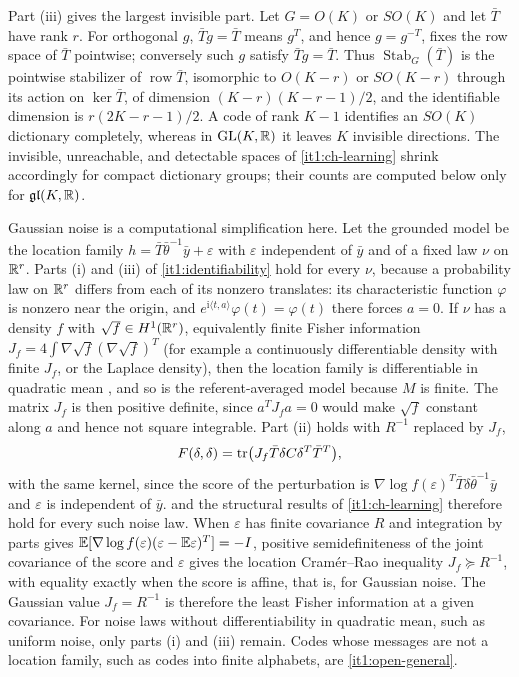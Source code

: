 Part (iii) gives the largest invisible part. Let $G=O(K)$ or $SO(K)$ and let $\bar T$ have rank $r$. For orthogonal $g$, $\bar Tg=\bar T$ means $g^T$, and hence $g=g^{-T}$, fixes the row space of $\bar T$ pointwise; conversely such $g$ satisfy $\bar Tg=\bar T$. Thus $\operatorname{Stab}_G(\bar T)$ is the pointwise stabilizer of $\operatorname{row}\bar T$, isomorphic to $O(K-r)$ or $SO(K-r)$ through its action on $\ker\bar T$, of dimension $(K-r)(K-r-1)/2$, and the identifiable dimension is $r(2K-r-1)/2$. A code of rank $K-1$ identifies an $SO(K)$ dictionary completely, whereas in $\mathrm{GL}(K,\mathbb R)$ it leaves $K$ invisible directions. The invisible, unreachable, and detectable spaces of \cref{it1:ch-learning} shrink accordingly for compact dictionary groups; their counts are computed below only for $\mathfrak{gl}(K,\mathbb R)$.

Gaussian noise is a computational simplification here. Let the grounded model be the location family $h=\bar T\bar\theta^{-1}\bar y+\varepsilon$ with $\varepsilon$ independent of $\bar y$ and of a fixed law $\nu$ on $\mathbb R^r$. Parts (i) and (iii) of \cref{it1:identifiability} hold for every $\nu$, because a probability law on $\mathbb R^r$ differs from each of its nonzero translates: its characteristic function $\varphi$ is nonzero near the origin, and $e^{\mathrm i\langle t,a\rangle}\varphi(t)=\varphi(t)$ there forces $a=0$. If $\nu$ has a density $f$ with $\sqrt f\in H^1(\mathbb R^r)$, equivalently finite Fisher information $J_f=4\int\nabla\sqrt f(\nabla\sqrt f)^T$ (for example a continuously differentiable density with finite $J_f$, or the Laplace density), then the location family is differentiable in quadratic mean \citep[Chapter~7]{vanderVaart1998}, and so is the referent-averaged model because $M$ is finite. The matrix $J_f$ is then positive definite, since $a^TJ_fa=0$ would make $\sqrt f$ constant along $a$ and hence not square integrable. Part (ii) holds with $R^{-1}$ replaced by $J_f$,
\begin{equation}
F(\delta,\delta)=\operatorname{tr}\bigl(J_f\bar T\delta C\delta^T\bar T^T\bigr),
\label{it1:fisher-location}
\end{equation}
with the same kernel, since the score of the perturbation is $\nabla\log f(\varepsilon)^T\bar T\delta\bar\theta^{-1}\bar y$ and $\varepsilon$ is independent of $\bar y$.  and the structural results of \cref{it1:ch-learning} therefore hold for every such noise law. When $\varepsilon$ has finite covariance $R$ and integration by parts gives $\mathbb E[\nabla\log f(\varepsilon)(\varepsilon-\mathbb E\varepsilon)^T]=-I$, positive semidefiniteness of the joint covariance of the score and $\varepsilon$ gives the location Cram\'er--Rao inequality $J_f\succeq R^{-1}$, with equality exactly when the score is affine, that is, for Gaussian noise. The Gaussian value $J_f=R^{-1}$ is therefore the least Fisher information at a given covariance. For noise laws without differentiability in quadratic mean, such as uniform noise, only parts (i) and (iii) remain. Codes whose messages are not a location family, such as codes into finite alphabets, are \cref{it1:open-general}.

